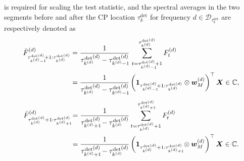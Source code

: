 is required for scaling the test statistic, 
and the spectral averages in the two segments before and after the CP location $\tau_k^{\text{det}}$ for frequency $d \in \mathcal{D}_{\tau_k^{\text{det}}}$ are respectively denoted as 
\begin{align}
  \bar{F}_{{{\tau_{k^{(d)}-1}^{\rm det}}^{\hspace{-4.3mm}(d)}+1:{\tau_{k^{(d)}}^{\text{det}}}^{\hspace{-1.2mm}(d)}}}^{(d)} 
  &= {\frac{1}{{\tau_{k^{(d)}}^{\text{det}}}^{\hspace{-0.7mm}(d)} - {\tau_{k^{(d)}-1}^{\rm det}}^{\hspace{-4.3mm}(d)}}} \, \sum_{t = {\tau_{k^{(d)}-1}^{\rm det}}^{\hspace{-4.3mm}(d)}+1}^{{\tau_{k^{(d)}}^{\text{det}}}^{\hspace{-1.2mm}(d)}} F_t^{(d)} \notag \\
  &= {\frac{1}{{\tau_{k^{(d)}}^{\text{det}}}^{\hspace{-0.7mm}(d)} - {\tau_{k^{(d)}-1}^{\rm det}}^{\hspace{-4.3mm}(d)}}} \left(\bm{1}_{{\tau_{k^{(d)}-1}^{\rm det}}^{\hspace{-4.3mm}(d)}+1:{\tau_{k^{(d)}}^{\text{det}}}^{\hspace{-1.2mm}(d)}} \otimes \bm{w}_M^{(d)}\right)^\top \bm{X} \in \mathbb{C}, \notag
\end{align}
\begin{align}
  \bar{F}_{{\tau_{k^{(d)}}^{\text{det}}}^{\hspace{-1.2mm}(d)}+1:{\tau_{k^{(d)}+1}^{\rm det}}^{\hspace{-4.3mm}(d)}}^{(d)} 
  &= \frac{1}{{\tau_{k^{(d)}+1}^{\rm det}}^{\hspace{-4.3mm}(d)} - {\tau_{k^{(d)}}^{\text{det}}}^{\hspace{-0.7mm}(d)}}\sum_{t = {\tau_{k^{(d)}}^{\text{det}}}^{\hspace{-1.2mm}(d)}+1}^{{\tau_{k^{(d)}+1}^{\rm det}}^{\hspace{-4.3mm}(d)}} F_t^{(d)} \notag \\
  &= \frac{1}{{\tau_{k^{(d)}+1}^{\rm det}}^{\hspace{-4.3mm}(d)} - {\tau_{k^{(d)}}^{\text{det}}}^{\hspace{-0.7mm}(d)}} \left(\bm{1}_{{\tau_{k^{(d)}}^{\text{det}}}^{\hspace{-1.2mm}(d)}+1:{\tau_{k^{(d)}+1}^{\rm det}}^{\hspace{-4.3mm}(d)}} \otimes \bm{w}_M^{(d)}\right)^\top \bm{X} \in \mathbb{C}. \notag
\end{align}
